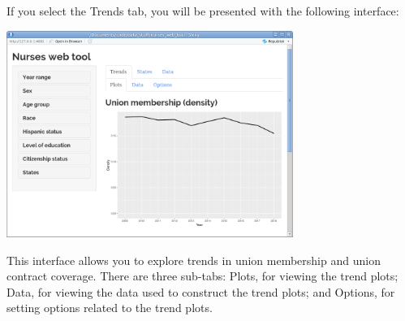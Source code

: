 \documentclass[letterpaper,12pt]{article}
\begin{document}
If you select the Trends tab, you will be presented with the following
interface:
\begin{center}
  \includegraphics[width=0.7\textwidth]{images/trends_interface.png}
\end{center}
This interface allows you to explore trends in union membership and
union contract coverage. There are three sub-tabs: Plots, for viewing
the trend plots; Data, for viewing the data used to construct the
trend plots; and Options, for setting options related to the trend
plots.
\end{document}

